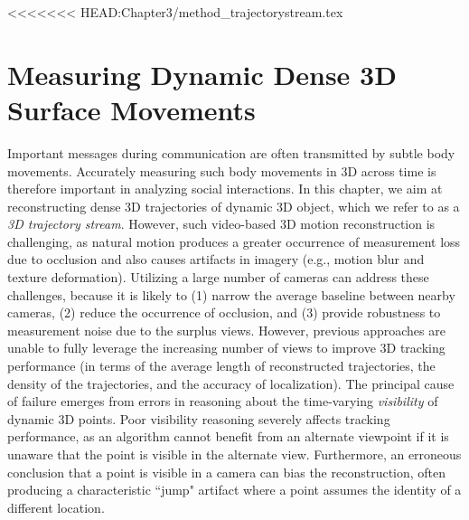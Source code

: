 <<<<<<< HEAD:Chapter3/method_trajectorystream.tex

\chapter{Measuring Dynamic Dense 3D Surface Movements}
\label{chapter:trajectory}

Important messages during communication are often transmitted by subtle body movements. Accurately measuring such body movements in 3D across time is therefore important in analyzing social interactions. In this chapter, we aim at reconstructing dense 3D trajectories of dynamic 3D object, which we refer to as a \emph{3D trajectory stream}. However, such video-based 3D motion reconstruction is challenging, as natural motion produces a greater occurrence of measurement loss due to occlusion and also causes artifacts in imagery (e.g., motion blur and texture deformation). Utilizing a large number of cameras can address these challenges, because it is likely to (1) narrow the average baseline between nearby cameras, (2) reduce the occurrence of occlusion, and (3) provide robustness to measurement noise due to the surplus views. However, previous approaches are unable to fully leverage the increasing number of views to improve 3D tracking performance (in terms of the average length of reconstructed trajectories, the density of the trajectories, and the accuracy of localization). The principal cause of failure emerges from errors in reasoning about the time-varying \emph{visibility} of dynamic 3D points. Poor visibility reasoning severely affects tracking performance, as an algorithm cannot benefit from an alternate viewpoint if it is unaware that the point is visible in the alternate view. Furthermore, an erroneous conclusion that a point is visible in a camera can bias the reconstruction, often producing a characteristic ``jump" artifact where a point assumes the identity of a different location.





